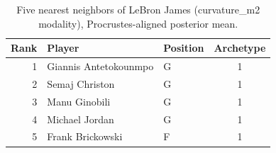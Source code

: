 \begin{table}[htbp]
  \centering\small
  \begin{tabular}{rllc}
    \toprule
    Rank & Player & Position & Archetype \\
    \midrule
    1 & Giannis Antetokounmpo & G & 1 \\
    2 & Semaj Christon & G & 1 \\
    3 & Manu Ginobili & G & 1 \\
    4 & Michael Jordan & G & 1 \\
    5 & Frank Brickowski & F & 1 \\
    \bottomrule
  \end{tabular}
  \caption{Five nearest neighbors of LeBron James (curvature_m2 modality), Procrustes-aligned posterior mean.}
  \label{tab:LeBron_James_neighbors_curvature_m2}
\end{table}

